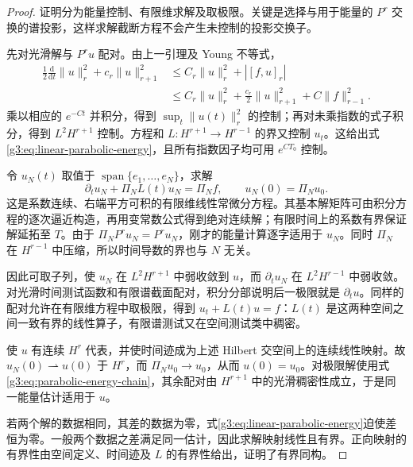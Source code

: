 \begin{proof}
	证明分为能量控制、有限维求解及取极限。关键是选择与用于能量的 \(P^r\) 交换的谱投影，这样求解截断方程不会产生未控制的投影交换子。

	先对光滑解与 \(P^ru\) 配对。由上一引理及 Young 不等式，
	\[
		\begin{aligned}
		\frac12\frac{\mathrm d}{\mathrm dt}\|u\|_r^2
		+c_r\|u\|_{r+1}^2
		&\le C_r\|u\|_r^2+|[f,u]_r|\\
		&\le C_r\|u\|_r^2+\frac{c_r}{2}\|u\|_{r+1}^2+C\|f\|_{r-1}^2.
		\end{aligned}
	\]
	乘以相应的 \(e^{-Ct}\) 并积分，得到 \(\sup_t\|u(t)\|_r^2\) 的控制；再对未乘指数的式子积分，得到 \(L^2H^{r+1}\) 控制。方程和 \(L:H^{r+1}\to H^{r-1}\) 的界又控制 \(u_t\)。这给出式\eqref{g3:eq:linear-parabolic-energy}，且所有指数因子均可用 \(e^{CT_0}\) 控制。

	令 \(u_N(t)\) 取值于 \(\operatorname{span}\{e_1,\ldots,e_N\}\)，求解
	\[
		\partial_tu_N+\Pi_NL(t)u_N=\Pi_Nf,
		\qquad u_N(0)=\Pi_Nu_0.
	\]
	这是系数连续、右端平方可积的有限维线性常微分方程。其基本解矩阵可由积分方程的逐次逼近构造，再用变常数公式得到绝对连续解；有限时间上的系数有界保证解延拓至 \(T\)。由于 \(\Pi_NP^ru_N=P^ru_N\)，刚才的能量计算逐字适用于 \(u_N\)。同时 \(\Pi_N\) 在 \(H^{r-1}\) 中压缩，所以时间导数的界也与 \(N\) 无关。

	因此可取子列，使 \(u_N\) 在 \(L^2H^{r+1}\) 中弱收敛到 \(u\)，而 \(\partial_tu_N\) 在 \(L^2H^{r-1}\) 中弱收敛。对光滑时间测试函数和有限谱截面配对，积分分部说明后一极限就是 \(\partial_tu\)。同样的配对允许在有限维方程中取极限，得到 \(u_t+L(t)u=f\)：\(L(t)\) 是这两种空间之间一致有界的线性算子，有限谱测试又在空间测试类中稠密。

	使 \(u\) 有连续 \(H^r\) 代表，并使时间迹成为上述 Hilbert 交空间上的连续线性映射。故 \(u_N(0)\rightharpoonup u(0)\) 于 \(H^r\)，而 \(\Pi_Nu_0\to u_0\)，从而 \(u(0)=u_0\)。对极限解使用式\eqref{g3:eq:parabolic-energy-chain}，其余配对由 \(H^{r+1}\) 中的光滑稠密性成立，于是同一能量估计适用于 \(u\)。

	若两个解的数据相同，其差的数据为零，式\eqref{g3:eq:linear-parabolic-energy}迫使差恒为零。一般两个数据之差满足同一估计，因此求解映射线性且有界。正向映射的有界性由空间定义、时间迹及 \(L\) 的有界性给出，证明了有界同构。
\end{proof}


